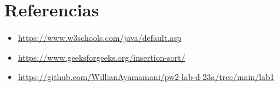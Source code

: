 \documentclass{article}
\begin{document}
\clearpage

\section{Referencias}
\begin{itemize}			
	\item \url{https://www.w3schools.com/java/default.asp}
	\item \url{https://www.geeksforgeeks.org/insertion-sort/}
    \item \url{https://github.com/WillianAyamamani/pw2-lab-d-23a/tree/main/lab1}
\end{itemize}	
	
%
%
%
			
\end{document}
